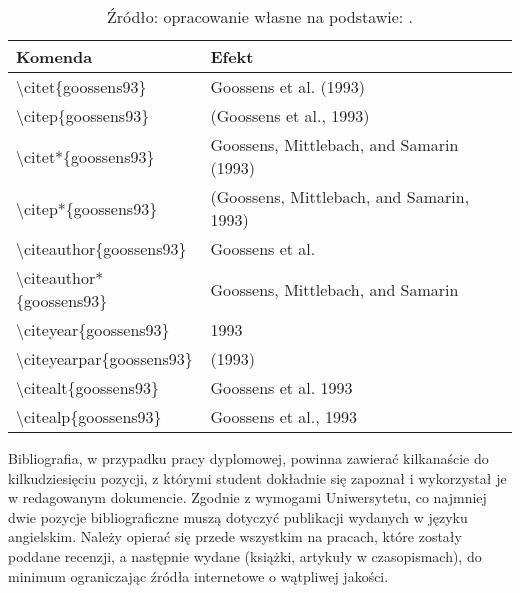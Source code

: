 \begin{table}[ht]
	\centering
	\caption{Przykładowy zestaw komend dla cytowania wewnątrztekstowego przy użyciu narzędzia \LaTeX~oraz pakietu natbib}
	\begin{tabularx}{\textwidth}{l l}
		\hline
		\textbf{Komenda} & \textbf{Efekt} \\
		\hline
		\textbackslash citet\{goossens93\}			& Goossens et al. (1993)\\
		\textbackslash citep\{goossens93\}			& (Goossens et al., 1993)\\
		\textbackslash citet*\{goossens93\}			& Goossens, Mittlebach, and Samarin (1993)\\
		\textbackslash citep*\{goossens93\}			& (Goossens, Mittlebach, and Samarin, 1993)\\
		\textbackslash citeauthor\{goossens93\}		& Goossens et al.\\
		\textbackslash citeauthor*\{goossens93\}	& Goossens, Mittlebach, and Samarin\\
		\textbackslash citeyear\{goossens93\}		& 1993\\
		\textbackslash citeyearpar\{goossens93\}	& (1993)\\
		\textbackslash citealt\{goossens93\}		& Goossens et al. 1993\\
		\textbackslash citealp\{goossens93\}		& Goossens et al., 1993\\
		\hline		
	\end{tabularx}
	\caption*{Źródło: opracowanie własne na podstawie: \citep{website:wikibooks}.}
	\label{tab:bnatbib}
\end{table}


Bibliografia, w przypadku pracy dyplomowej, powinna zawierać kilkanaście do kilkudziesięciu pozycji, z którymi student dokładnie się zapoznał i wykorzystał je w redagowanym dokumencie. Zgodnie z wymogami Uniwersytetu, co najmniej dwie pozycje bibliograficzne muszą dotyczyć publikacji wydanych w języku angielskim. Należy opierać się przede wszystkim na pracach, które zostały poddane recenzji, a następnie wydane (książki, artykuły w czasopismach), do minimum ograniczając źródła internetowe o wątpliwej jakości.